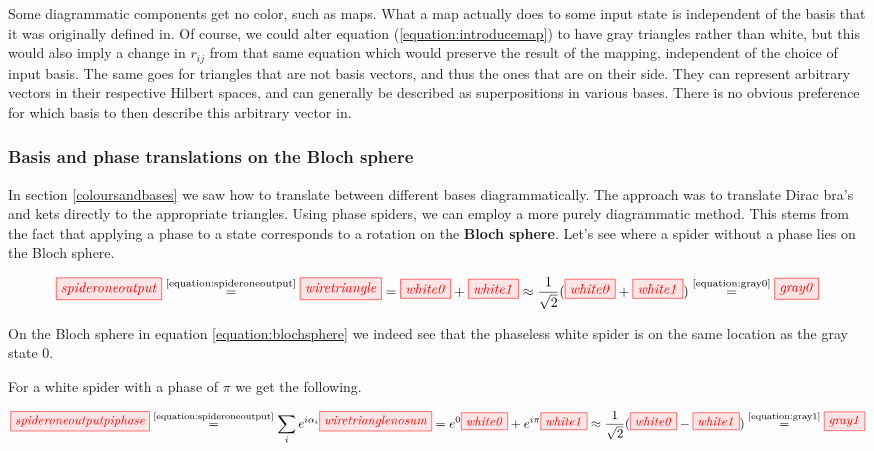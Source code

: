 \documentclass[]{article}
\newcommand{\equaltext}[1]{\ensuremath{\stackrel{\text{#1}}{=}}}
\begin{document}
Some diagrammatic components get no color, such as maps. What a map actually does to some input state is independent of the basis that it was originally defined in. Of course, we could alter equation (\ref{equation:introducemap}) to have gray triangles rather than white, but this would also imply a change in $r_{ij}$ from that same equation which would preserve the result of the mapping, independent of the choice of input basis. The same goes for triangles that are not basis vectors, and thus the ones that are on their side. They can represent arbitrary vectors in their respective Hilbert spaces, and can generally be described as superpositions in various bases. There is no obvious preference for which basis to then describe this arbitrary vector in.


\subsubsection{Basis and phase translations on the Bloch sphere}
\label{section:basisandphasetranslations}
In section \ref{coloursandbases} we saw how to translate between different bases diagrammatically. The approach was to translate Dirac bra's and kets directly to the appropriate triangles. Using phase spiders, we can employ a more purely diagrammatic method. This stems from the fact that applying a phase to a state corresponds to a rotation on the \textbf{Bloch sphere}. Let's see where a spider without a phase lies on the Bloch sphere.

\begin{equation}
\tikzfig{spideroneoutput} \equaltext{\ref{equation:spideroneoutput}} \tikzfig{wiretriangle} = \tikzfig{white0} + \tikzfig{white1} \approx \frac{1}{\sqrt{2}}(\tikzfig{white0} + \tikzfig{white1}) \equaltext{\ref{equation:gray0}} \tikzfig{gray0}
\end{equation}

On the Bloch sphere in equation \ref{equation:blochsphere} we indeed see that the phaseless white spider is on the same location as the gray state 0.

For a white spider with a phase of $\pi$ we get the following.

\begin{equation}
\tikzfig{spideroneoutputpiphase} \equaltext{\ref{equation:spideroneoutput}} \sum\limits_{i} e^{i\alpha_i}\tikzfig{wiretrianglenosum} = e^{0}\tikzfig{white0} + e^{i\pi}\tikzfig{white1} \approx \frac{1}{\sqrt{2}}(\tikzfig{white0} - \tikzfig{white1}) \equaltext{\ref{equation:gray1}} \tikzfig{gray1}
\end{equation}
\end{document}
